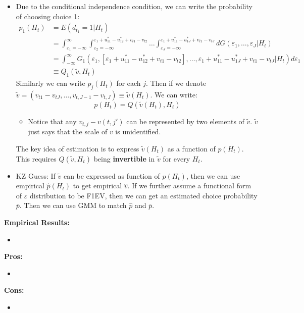 \documentclass{book}
\theoremstyle{plain}
\theoremstyle{definition}
\begin{document}
\begin{itemize}
	\item 
	Due to the conditional independence condition, we can write the probability of choosing choice 1:
	\begin{align*}
	p_1(H_t)&=E(d_{t_1}=1|H_t) \\
	&=\int_{\varepsilon_1=-\infty}^\infty \int_{\varepsilon_2=-\infty}^{\varepsilon_1+u^*_{11}-u^*_{12}+v_{t1}-v_{t2}}\dots \int_{\varepsilon_J=-\infty}^{\varepsilon_1+u^*_{11}-u^*_{1J}+v_{t1}-v_{tJ}} dG(\varepsilon_1,\dots,\varepsilon_J|H_t) \\
	&= \int_{-\infty}^{\infty}G_1(\varepsilon_1,[\varepsilon_1+u^*_{11}-u^*_{12}+v_{t1}-v_{t2}],\dots,\varepsilon_1+u^*_{11}-u^*_{1J}+v_{t1}-v_{tJ}|H_t)d \varepsilon_1 \\
	& \equiv Q_1(\tilde v,H_t)
	\end{align*}
	Similarly we can write $p_j(H_t)$ for each $j$.
	Then if we denote $\tilde v = (v_{t1}-v_{tJ},\dots,v_{t,J-1}-v_{t,J}) \equiv \tilde v(H_t)$. 
	We can write:
	\[p(H_t)=Q(\tilde v(H_t),H_t)\]
	\begin{itemize}
		\item Notice that any $v_{t,j}-v(t,j')$ can be represented by two elements of $\tilde v$. $\tilde v$ just says that the scale of $v$ is unidentified.
	\end{itemize}
	The key idea of estimation is to express $\tilde v(H_t)$ as a function of $p(H_t)$. This requires $Q(\tilde v,H_t)$ being \textbf{invertible} in $\tilde v$ for every $H_t$.

	\item KZ Guess: If $\tilde v$ can be expressed as function of $p(H_t)$, then we can use empirical $\hat p(H_t)$ to get empirical $\hat v$. If we further assume a functional form of $\varepsilon$ distribution to be F1EV, then we can get an estimated choice probability $\bar p$. Then we can use GMM to match $\hat p$ and $\bar p$.
\end{itemize}

\vspace{1em}
\noindent
\textbf{Empirical Results:}
\begin{itemize}
	\item 
\end{itemize}

\vspace{1em}
\noindent
\textbf{Pros:}
\begin{itemize}
	\item 
\end{itemize}

\vspace{1em}
\noindent
\textbf{Cons:}
\begin{itemize}
	\item 
\end{itemize}
\end{document}
